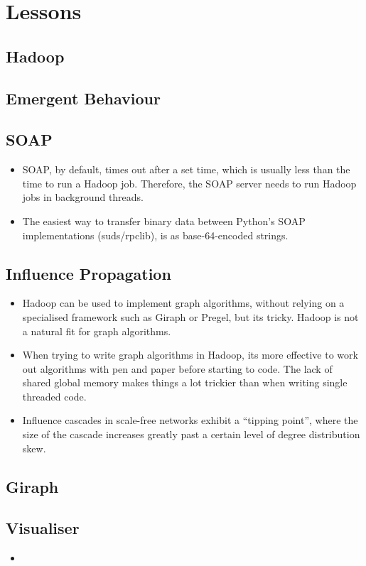 \section{Lessons}


\subsection{Hadoop}

\subsection{Emergent Behaviour}

\subsection{SOAP}

\begin{itemize}
  \item SOAP, by default, times out after a set time, which is usually less than the time to run a Hadoop job. Therefore, the SOAP server needs to run Hadoop jobs in background threads.
  \item The easiest way to transfer binary data between Python's SOAP implementations (suds/rpclib), is as base-64-encoded strings.
\end{itemize}

\subsection{Influence Propagation}

\begin{itemize}
	\item Hadoop can be used to implement graph algorithms, without relying on a specialised framework such as Giraph or Pregel, but its tricky. Hadoop is not a natural fit for graph algorithms.
	\item When trying to write graph algorithms in Hadoop, its more effective to work out algorithms with pen and paper before starting to code. The lack of shared global memory makes things a lot trickier than when writing single threaded code.
        \item Influence cascades in scale-free networks exhibit a ``tipping point'', where the size of the cascade increases greatly past a certain level of degree distribution skew.
\end{itemize}

\subsection{Giraph}

\subsection{Visualiser}

\begin{itemize}
  \item  
\end{itemize}

